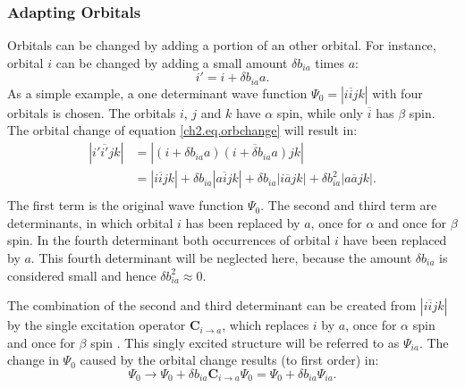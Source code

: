 \subsubsection{Adapting Orbitals}

Orbitals can be changed by adding a portion of an other orbital. For instance, orbital $i$ can be changed by adding a small amount $\delta b_{ia}$ times $a$:
\begin{equation}
i' = i + \delta b_{ia} a.
\label{ch2.eq.orbchange}
\end{equation}
As a simple example, a one determinant wave function $\Psi_0=|i\overline{i}jk|$ with four orbitals is chosen. The orbitals $i$, $j$ and $k$ have $\alpha$ spin, while only $\overline{i}$ has $\beta$ spin. The orbital change of equation \ref{ch2.eq.orbchange} will result in:
\begin{equation}    
\begin{split}
|i'\overline{i'}jk | & = |(i + \delta b_{ia} a)\overline{(i + \delta b_{ia}a)}jk |\\
& = |i\overline{i}jk| + \delta b_{ia}|a\overline{i}jk| + \delta b_{ia} |i\overline{a}jk| + \delta b^2_{ia} |a\overline{a}jk|.\\
\end{split}
\label{ch2.eq.detchange}
\end{equation}
The first term is the original wave function $\Psi_0$. The second and third term are determinants, in which orbital $i$ has been replaced by $a$, once for $\alpha$ and once for $\beta$ spin. In the fourth determinant both occurrences of orbital $i$ have been replaced by $a$. This fourth determinant will be neglected here, because the amount $\delta b_{ia}$ is considered small and hence $\delta b_{ia}^2 \approx 0$.

The combination of the second and third determinant can be created from $|i\overline{i}jk |$ by the single excitation operator $\mathbf{C}_{i \rightarrow a}$, which replaces $i$ by $a$, once for $\alpha$ spin and once for $\beta$ spin \cite{ruttink}. This singly excited structure will be referred to as $\Psi_{ia}$.   The change in $\Psi_0$ caused by the orbital change results (to first order) in:
\begin{equation}
\Psi_{0} \rightarrow \Psi_{0} + \delta b_{ia} \mathbf{C}_{i \rightarrow a} \Psi_{0} = \Psi_{0} + \delta b_{ia} \Psi_{ia}.
\label{ch2.eq.wfchange}
\end{equation}

